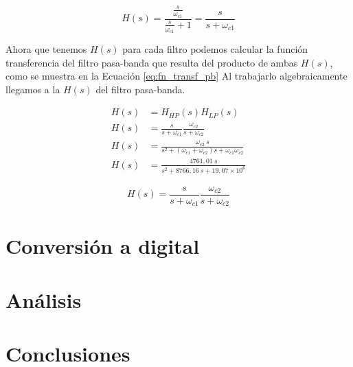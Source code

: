 \begin{equation}
  H(s) = \frac{\frac{s}{\omega_{c1}}}{\frac{s}{\omega_{c1}}+1} = \frac{s}{s + \omega_{c1}}
  \label{eq:fn_transf_pa_n1_desnormalizada}
\end{equation}

Ahora que tenemos $H(s)$ para cada filtro podemos calcular la función transferencia del filtro pasa-banda que resulta del producto de ambas $H(s)$, como se muestra en la Ecuación \ref{eq:fn_transf_pb} Al trabajarlo algebraicamente llegamos a la $H(s)$ del filtro pasa-banda.

\begin{align}
  H(s) & = H_{HP}(s) H_{LP}(s)                                                                 \\
  H(s) & = \frac{s}{s+\omega_{c1}}\frac{\omega_{c2}}{s+\omega_{c2}}                            \\
  H(s) & = \frac{\omega_{c2}\ s}{s^2  + (\omega_{c1} + \omega_{c2})s + \omega_{c1}\omega_{c2}} \\
  H(s) & = \frac{4761,01\ s}{s^2 + 8766,16\ s + 19,07\times 10^6}
\end{align}

\begin{equation}
  H(s) = \frac{s}{s+\omega_{c1}}\frac{\omega_{c2}}{s+\omega_{c2}}
  \label{eq:fn_transf_pb}
\end{equation}


\section{Conversión a digital}

\section{Análisis}

\section{Conclusiones}